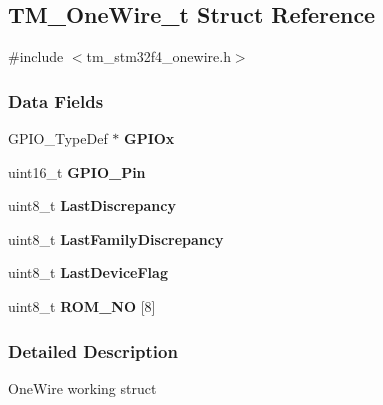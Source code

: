 \hypertarget{struct_t_m___one_wire__t}{}\subsection{T\+M\+\_\+\+One\+Wire\+\_\+t Struct Reference}
\label{struct_t_m___one_wire__t}


{\ttfamily \#include $<$tm\+\_\+stm32f4\+\_\+onewire.\+h$>$}

\subsubsection*{Data Fields}
\begin{DoxyCompactItemize}
\item 
\hypertarget{struct_t_m___one_wire__t_a1cb502d7339fa12f24109da591102eb2}{}G\+P\+I\+O\+\_\+\+Type\+Def $\ast$ {\bfseries G\+P\+I\+Ox}\label{struct_t_m___one_wire__t_a1cb502d7339fa12f24109da591102eb2}

\item 
\hypertarget{struct_t_m___one_wire__t_a0beac3d072f6aaaae29e9e2e400b2f11}{}uint16\+\_\+t {\bfseries G\+P\+I\+O\+\_\+\+Pin}\label{struct_t_m___one_wire__t_a0beac3d072f6aaaae29e9e2e400b2f11}

\item 
\hypertarget{struct_t_m___one_wire__t_a74d3fb1139221f43389a137d1fe856e5}{}uint8\+\_\+t {\bfseries Last\+Discrepancy}\label{struct_t_m___one_wire__t_a74d3fb1139221f43389a137d1fe856e5}

\item 
\hypertarget{struct_t_m___one_wire__t_aaa2e862c58299b2baad5495a5af5357b}{}uint8\+\_\+t {\bfseries Last\+Family\+Discrepancy}\label{struct_t_m___one_wire__t_aaa2e862c58299b2baad5495a5af5357b}

\item 
\hypertarget{struct_t_m___one_wire__t_a96f6f3ee886dae875baddbc896a51eb5}{}uint8\+\_\+t {\bfseries Last\+Device\+Flag}\label{struct_t_m___one_wire__t_a96f6f3ee886dae875baddbc896a51eb5}

\item 
\hypertarget{struct_t_m___one_wire__t_a9d063996b61210a9b7bc6d91c881bb1d}{}uint8\+\_\+t {\bfseries R\+O\+M\+\_\+\+N\+O} \mbox{[}8\mbox{]}\label{struct_t_m___one_wire__t_a9d063996b61210a9b7bc6d91c881bb1d}

\end{DoxyCompactItemize}


\subsubsection{Detailed Description}
One\+Wire working struct


